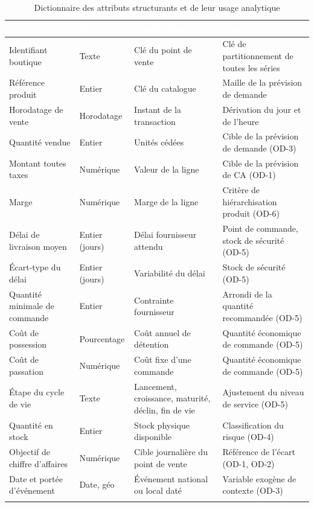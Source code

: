 \begin{longtable}{|P{3.3cm}|P{2.0cm}|P{5.0cm}|P{3.6cm}|}
\hline
{}
\textcolor{white}{\textbf{Attribut}} &
\textcolor{white}{\textbf{Type}} &
\textcolor{white}{\textbf{Signification}} &
\textcolor{white}{\textbf{Usage analytique}} \\
\hline
\endhead
\hline
\endfoot
\hline
\endlastfoot
Identifiant boutique & Texte & Clé du point de vente & Clé de partitionnement de toutes les séries \\
\hline
Référence produit & Entier & Clé du catalogue & Maille de la prévision de demande \\
\hline
Horodatage de vente & Horodatage & Instant de la transaction & Dérivation du jour et de l'heure \\
\hline
Quantité vendue & Entier & Unités cédées & Cible de la prévision de demande (OD-3) \\
\hline
Montant toutes taxes & Numérique & Valeur de la ligne & Cible de la prévision de CA (OD-1) \\
\hline
Marge & Numérique & Marge de la ligne & Critère de hiérarchisation produit (OD-6) \\
\hline
Délai de livraison moyen & Entier (jours) & Délai fournisseur attendu & Point de commande, stock de sécurité (OD-5) \\
\hline
Écart-type du délai & Entier (jours) & Variabilité du délai & Stock de sécurité (OD-5) \\
\hline
Quantité minimale de commande & Entier & Contrainte fournisseur & Arrondi de la quantité recommandée (OD-5) \\
\hline
Coût de possession & Pourcentage & Coût annuel de détention & Quantité économique de commande (OD-5) \\
\hline
Coût de passation & Numérique & Coût fixe d'une commande & Quantité économique de commande (OD-5) \\
\hline
Étape du cycle de vie & Texte & Lancement, croissance, maturité, déclin, fin de vie & Ajustement du niveau de service (OD-5) \\
\hline
Quantité en stock & Entier & Stock physique disponible & Classification du risque (OD-4) \\
\hline
Objectif de chiffre d'affaires & Numérique & Cible journalière du point de vente & Référence de l'écart (OD-1, OD-2) \\
\hline
Date et portée d'événement & Date, géo & Événement national ou local daté & Variable exogène de contexte (OD-3) \\
\hline
\caption{Dictionnaire des attributs structurants et de leur usage analytique}
\label{tab:dictionnaire-chap3}
\end{longtable}
\endgroup

